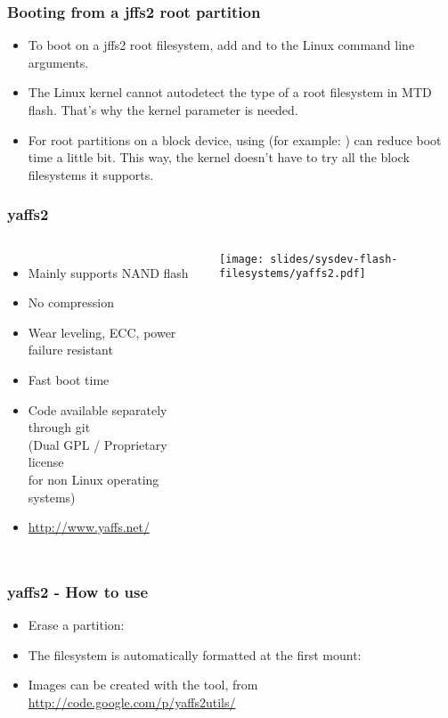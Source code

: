 \begin{frame}
  \frametitle{Booting from a jffs2 root partition}
  \begin{itemize}
  \item To boot on a jffs2 root filesystem, add
     and  to the
    Linux command line arguments.
  \item The Linux kernel cannot autodetect the type of a root filesystem
    in MTD flash. That's why the  kernel parameter is
    needed.
  \item For root partitions on a block device, using  
    (for example: ) can reduce boot time a little
    bit. This way, the kernel doesn't have to try all the block
    filesystems it supports.
  \end{itemize}
\end{frame}


\begin{frame}
  \frametitle{yaffs2}
  \begin{columns}
    \begin{itemize}
    \item Mainly supports NAND flash
    \item No compression
    \item Wear leveling, ECC, power failure resistant
    \item Fast boot time
    \item Code available separately through git\\
      (Dual GPL / Proprietary license\\
      for non Linux operating systems)
    \item \url{http://www.yaffs.net/}
    \end{itemize}
    \texttt{[image: slides/sysdev-flash-filesystems/yaffs2.pdf]}
  \end{columns}
\end{frame}

\begin{frame}
  \frametitle{yaffs2 - How to use}
  \begin{itemize}
  \item Erase a partition:\\
  \item The filesystem is automatically formatted at the first mount:\\
  \item Images can be created with the  tool, from \\
    \url{http://code.google.com/p/yaffs2utils/}
  \end{itemize}
\end{frame}

